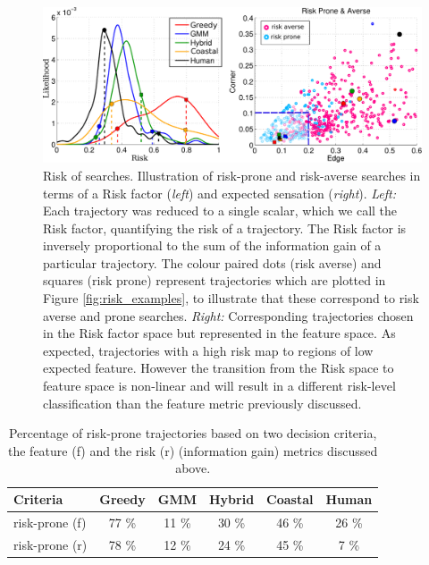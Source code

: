 \begin{figure}
  \centering
  \includegraphics[width=\textwidth]{./ch3-Search/Figures/risk-averse-dist-features} 
 \caption{Risk of searches. Illustration of risk-prone and risk-averse searches in terms of a Risk factor (\textit{left}) and expected sensation (\textit{right}).
 \textit{Left:} Each trajectory was reduced to a single scalar, which we call the Risk factor, quantifying the risk of a trajectory. The Risk factor 
 is inversely proportional to the sum of the information gain of a particular trajectory. The colour paired dots (risk averse) and squares (risk prone) 
 represent trajectories which are plotted in 
 Figure \ref{fig:risk_examples}, to illustrate that these correspond to risk averse and prone searches.
 \textit{Right:} Corresponding trajectories chosen in the Risk factor space but represented in the feature space. As expected, trajectories with
 a high risk map to regions of low expected feature. However the transition from the Risk space to feature space is non-linear and will result in a different
 risk-level classification than the feature metric previously discussed.}
 \label{fig:riskexamples}
\end{figure}



\begin{table}
\centering
\begin{minipage}{\textwidth}
\centering
 \begin{tabular}{|l|c|c|c|c|c|}
 \cline{1-6}
   Criteria        &  \textbf{Greedy} & \textbf{GMM}  & \textbf{Hybrid} & \textbf{Coastal} & \textbf{Human} \\ \hline
  risk-prone (f) &   77 \% & 11 \% &  30 \% & 46 \% & 26  \% \\ \hline
  risk-prone (r) &   78 \% & 12 \% &  24 \% & 45 \% &  7 \% \\ \hline
 \end{tabular}
\end{minipage}
 \caption{Percentage of risk-prone trajectories based on two decision criteria, the feature (f) and the risk (r) (information gain) metrics discussed above.}
 \label{tab:percentage-risk-prone}
\end{table}

